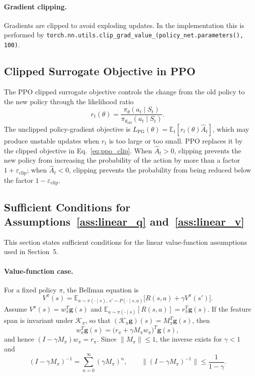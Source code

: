 \documentclass{article}
\numberwithin{equation}{section}
\theoremstyle{definition}
\newcommand{\old}{\text{old}}
\begin{document}
\paragraph{Gradient clipping.}
Gradients are clipped to avoid exploding updates. In the implementation this is performed by \texttt{torch.nn.utils.clip\_grad\_value\_(policy\_net.parameters(), 100)}.

\subsection{Clipped Surrogate Objective in PPO}
The PPO clipped surrogate objective controls the change from the old policy to the new policy through the likelihood ratio
\[
r_t(\theta)=\frac{\pi_\theta(a_t\mid S_t)}{\pi_{\theta_{\old}}(a_t\mid S_t)}.
\]
The unclipped policy-gradient objective is $L_{\mathrm{PG}}(\theta)=\mathbb{E}_t[r_t(\theta)\widehat A_t]$, which may produce unstable updates when $r_t$ is too large or too small. PPO replaces it by the clipped objective in Eq.~\eqref{eq:ppo_clip}. When $\widehat A_t>0$, clipping prevents the new policy from increasing the probability of the action by more than a factor $1+\varepsilon_{\mathrm{clip}}$; when $\widehat A_t<0$, clipping prevents the probability from being reduced below the factor $1-\varepsilon_{\mathrm{clip}}$.

\subsection{Sufficient Conditions for Assumptions~\ref{ass:linear_q} and~\ref{ass:linear_v}}\label{app:w_derivation_detail}
This section states sufficient conditions for the linear value-function assumptions used in Section~5.

\paragraph{Value-function case.}
For a fixed policy $\pi$, the Bellman equation is
\begin{equation*}
V^\pi(s)=\mathbb{E}_{a\sim\pi(\cdot\mid s),\,s'\sim P(\cdot\mid s,a)}
\bigl[R(s,a)+\gamma V^\pi(s')\bigr].
\end{equation*}
Assume $V^\pi(s)=w_\pi^T\mathbf g(s)$ and $\mathbb{E}_{a\sim\pi(\cdot\mid s)}[R(s,a)]=r_\pi^T\mathbf g(s)$. If the feature span is invariant under $\mathcal{K}_\pi$, so that $(\mathcal{K}_\pi\mathbf g)(s)=M_\pi^T\mathbf g(s)$, then
\[
w_\pi^T\mathbf g(s)=\bigl(r_\pi+\gamma M_\pi w_\pi\bigr)^T\mathbf g(s),
\]
and hence $(I-\gamma M_\pi)w_\pi=r_\pi$. Since $\|M_\pi\|\le1$, the inverse exists for $\gamma<1$ and
\[
(I-\gamma M_\pi)^{-1}=\sum_{n=0}^{\infty}(\gamma M_\pi)^n,
\qquad
\|(I-\gamma M_\pi)^{-1}\|\le\frac{1}{1-\gamma}.
\]
\end{document}
